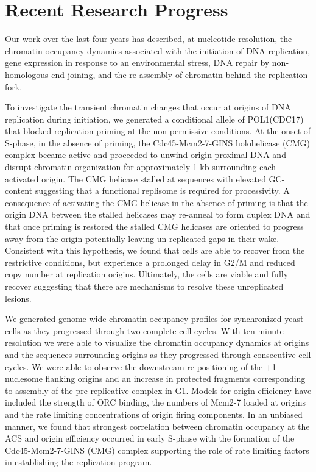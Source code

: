 \section{Recent Research Progress}
Our work over the last four years has described, at nucleotide resolution, the chromatin occupancy dynamics associated with the initiation of DNA replication\citep{}, gene expression in response to an environmental stress\cite{}, DNA repair by non-homologous end joining\citep{}, and the re-assembly of chromatin behind the replication fork\citep{}.  

To investigate the transient chromatin changes that occur at origins of DNA replication during initiation, we generated a conditional allele of POL1(CDC17) that blocked replication priming at the non-permissive conditions.  At the onset of S-phase, in the absence of priming, the Cdc45-Mcm2-7-GINS holohelicase (CMG) complex became active and proceeded to unwind origin proximal DNA and disrupt chromatin organization for approximately 1 kb surrounding each activated origin. The CMG helicase stalled at sequences with elevated GC-content suggesting that a functional replisome is required for processivity. A consequence of activating the CMG helicase in the absence of priming is that the origin DNA between the stalled helicases may re-anneal to form duplex DNA and that once priming is restored the stalled CMG helicases are oriented to progress away from the origin potentially leaving un-replicated gaps in their wake. Consistent with this hypothesis, we found that cells are able to recover from the restrictive conditions, but experience a prolonged delay in G2/M and reduced copy number at replication origins. Ultimately, the cells are viable and fully recover suggesting that there are mechanisms to resolve these unreplicated lesions.  

We generated genome-wide chromatin occupancy profiles for synchronized yeast cells as they progressed through two complete cell cycles.  With ten minute resolution we were able to visualize the chromatin occupancy dynamics at origins and the sequences surrounding origins as they progressed through consecutive cell cycles.  We were able to observe the downstream re-positioning of the +1 nuclesome flanking origins and an increase in protected fragments corresponding to assembly of the pre-replicative complex in G1.  Models for origin efficiency have included the strength of ORC binding, the numbers of Mcm2-7 loaded at origins and the rate limiting concentrations of origin firing components.  In an unbiased manner, we found that strongest correlation between chromatin occupancy at the ACS and origin efficiency occurred in early S-phase with the formation of the Cdc45-Mcm2-7-GINS (CMG) complex supporting the role of rate limiting factors in establishing the replication program.  

